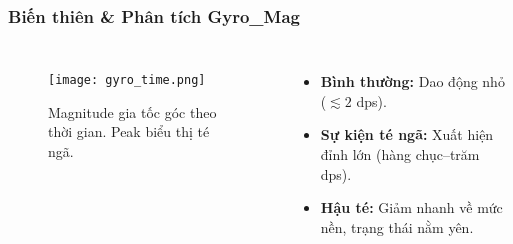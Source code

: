 \begin{frame}[t,fragile]
\frametitle{Biến thiên & Phân tích Gyro\_Mag}
\begin{columns}[T]
    \begin{figure}[H]
        \centering
        \texttt{[image: gyro\_time.png]}
        \caption{Magnitude gia tốc góc theo thời gian. Peak biểu thị té ngã.}
    \end{figure}
    \begin{itemize}
        \item \textbf{Bình thường:} Dao động nhỏ ($\lesssim 2$ dps).
        \item \textbf{Sự kiện té ngã:} Xuất hiện đỉnh lớn (hàng chục–trăm dps).
        \item \textbf{Hậu té:} Giảm nhanh về mức nền, trạng thái nằm yên.
    \end{itemize}
\end{columns}
\end{frame}

